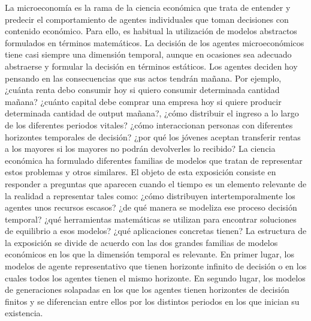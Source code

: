 \documentclass{nuevotema}
\begin{document}
\ideaclave

La microeconomía es la rama de la ciencia económica que trata de entender y predecir el comportamiento de agentes individuales que toman decisiones con contenido económico. Para ello, es habitual la utilización de modelos abstractos formulados en términos matemáticos. La decisión de los agentes microeconómicos tiene casi siempre una dimensión temporal, aunque en ocasiones sea adecuado abstraerse y formular la decisión en términos estáticos. Los agentes deciden hoy pensando en las consecuencias que sus actos tendrán mañana. Por ejemplo, ¿cuánta renta debo consumir hoy si quiero consumir determinada cantidad mañana? ¿cuánto capital debe comprar una empresa hoy si quiere producir determinada cantidad de output mañana?, ¿cómo distribuir el ingreso a lo largo de los diferentes periodos vitales? ¿cómo interaccionan personas con diferentes horizontes temporales de decisión? ¿por qué los jóvenes aceptan transferir rentas a los mayores si los mayores no podrán devolverles lo recibido? La ciencia económica ha formulado diferentes familias de modelos que tratan de representar estos problemas y otros similares. El objeto de esta exposición consiste en responder a preguntas que aparecen cuando el tiempo es un elemento relevante de la realidad a representar tales como: ¿cómo distribuyen intertemporalmente los agentes unos recursos escasos? ¿de qué manera se modeliza ese proceso decisión temporal? ¿qué herramientas matemáticas se utilizan para encontrar soluciones de equilibrio a esos modelos? ¿qué aplicaciones concretas tienen? La estructura de la exposición se divide de acuerdo con las dos grandes familias de modelos económicos en los que la dimensión temporal es relevante. En primer lugar, los modelos de agente representativo que tienen horizonte infinito de decisión o en los cuales todos los agentes tienen el mismo horizonte. En segundo lugar, los modelos de generaciones solapadas en los que los agentes tienen horizontes de decisión finitos y se diferencian entre ellos por los distintos periodos en los que inician su existencia.
\end{document}

